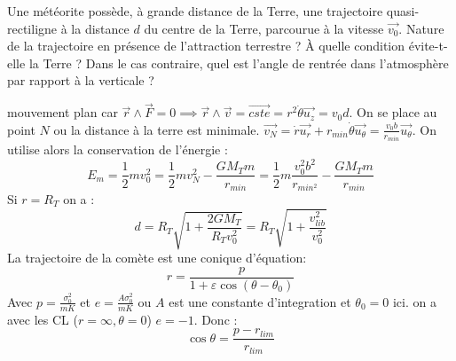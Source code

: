\begin{Exercise}[title=Chute d'une comète]
  Une météorite possède, à grande distance de la Terre, une trajectoire quasi-rectiligne à la distance $d$ du centre de la Terre, parcourue à la vitesse $\vec{v_0}$.
    \Question Nature de la trajectoire en présence de l'attraction  terrestre ?
    \Question À quelle condition évite-t-elle la Terre ?
    \Question Dans le cas contraire, quel est l'angle de rentrée dans l'atmosphère par rapport à la verticale ?
\end{Exercise}
\begin{Answer}
  \Question mouvement plan car $\vec{r} \wedge \vec{F} = 0 \implies \vec{r} \wedge \vec{v} = \vec{cste} =  r^2 \dot{\theta}\vec{u_z}  = v_0 d$.
  \Question  On se place au point $N$ ou la distance à la terre est minimale. $\vec{v_N} = \dot{r}\vec{u_r}+r_{min}\dot{\theta}\vec{u_\theta} = \frac{v_0b}{r_{min}}\vec{u_\theta}$.
  On utilise alors la conservation de l'énergie : \[E_m = \frac{1}{2}mv_0^2 = \frac{1}{2}mv_{N}^2-\frac{GM_Tm}{r_{min}} = \frac{1}{2}m \frac{v_0^2b^2}{r_{min^2}}-\frac{G M_T m}{r_{min}} \]
  Si $r = R_T$ on a :
 \[
   d = R_T \sqrt{1+\frac{2GM_T}{R_Tv_0^2}} =R_T \sqrt{1+\frac{v_{lib}^2}{v_0^2}}
 \]
 \Question La trajectoire de la comète est une conique d'équation:
 \[
   r = \frac{p}{1+\varepsilon \cos(\theta-\theta_0)}
 \]
 Avec $p = \frac{\sigma_0^2}{mK}$ et $e= \frac{A\sigma_0^2}{mK}$  ou $A$ est une constante d'integration et $\theta_0=0$ ici. on a avec les CL ($r=\infty,\theta=0$) $e=-1$. Donc :
 \[
   \cos{\theta} = \frac{p-r_{lim}}{r_{lim}}
 \]

\end{Answer}
